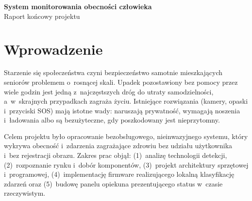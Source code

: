 \documentclass[11pt,a4paper]{article}
\begin{document}
\begin{center}
  {\Large\bfseries System monitorowania obecno\'sci cz\l owieka}\\[0.3em]
  {\large Raport ko\'ncowy projektu}
\end{center}
\vspace{1.5em}

{\setlength{\parskip}{0pt}\tableofcontents}
\newpage

\begin{abstract}
\noindent
Celem projektu by\l o zaprojektowanie i~zbudowanie dzia\l aj\k acego prototypu
bezkontaktowego systemu monitorowania obecno\'sci cz\l owieka, ukierunkowanego na
bezpiecze\'nstwo os\'ob starszych mieszkaj\k acych samotnie. System rozpoznaje cztery
klasy zdarze\'n: obecno\'s\'c, upadek, po\.zar oraz d\l ugotrwa\l y
bezruch. Rozpoznanie opiera si\k e na danych z~radaru fal milimetrowych 60~GHz,
bez rejestracji obrazu. Dane s\k a odczytywane po magistrali I\textsuperscript{2}C
przez mikrokontroler ESP32-C6, kt\'ory klasyfikuje sytuacj\k e lokalnie
(\emph{edge computing}) i~publikuje status w~formacie JSON do brokera MQTT.
Przegl\k adarkowy panel opiekuna subskrybuje brokera przez WebSocket i~pokazuje
stan pomieszcze\'n w~czasie rzeczywistym, wraz z~alarmem d\'zwi\k ekowym i~rozr\'o\.znieniem
stanu ,,pusty pok\'oj'' od ,,utrata \l \k aczno\'sci''. Efektem prac jest kompletny,
dzia\l aj\k acy przep\l yw \emph{end-to-end}: czujnik $\rightarrow$ firmware $\rightarrow$
broker $\rightarrow$ panel. Konfiguracja Wi-Fi i~adresu brokera odbywa si\k e
z~telefonu przez \emph{captive portal}, bez zaszywania danych w~kodzie.
\end{abstract}

\section{Wprowadzenie}

Starzenie si\k e spo\l ecze\'nstwa czyni bezpiecze\'nstwo samotnie mieszkaj\k acych
senior\'ow problemem o~rosn\k acej skali. Upadek pozostawiony bez pomocy przez wiele
godzin jest jedn\k a z~najcz\k estszych dr\'og do utraty samodzielno\'sci, a~w~skrajnych
przypadkach zagra\.za \.zyciu. Istniej\k ace rozwi\k azania (kamery, opaski
i~przyciski SOS) maj\k a istotne wady: naruszaj\k a prywatno\'s\'c, wymagaj\k a noszenia
i~\l adowania albo s\k a bezu\.zyteczne, gdy poszkodowany jest nieprzytomny.

Celem projektu by\l o opracowanie bezobs\l ugowego, nieinwazyjnego systemu, kt\'ory
wykrywa obecno\'s\'c i~zdarzenia zagra\.zaj\k ace zdrowiu bez udzia\l u u\.zytkownika
i~bez rejestracji obrazu. Zakres prac obj\k a\l: (1)~analiz\k e technologii detekcji,
(2)~rozpoznanie rynku i~dob\'or komponent\'ow, (3)~projekt architektury sprz\k etowej
i~programowej, (4)~implementacj\k e firmware realizuj\k acego lokaln\k a klasyfikacj\k e
zdarze\'n oraz (5)~budow\k e panelu opiekuna prezentuj\k acego status w~czasie
rzeczywistym.
\end{document}

